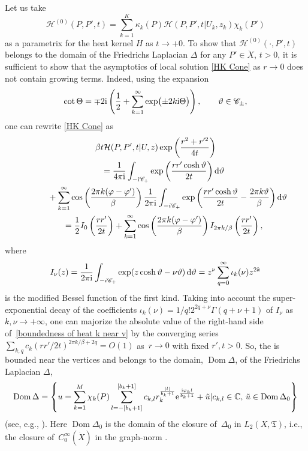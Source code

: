 \documentclass[pdftex]{sigma}
\numberwithin{equation}{section}
\theoremstyle{definition}
\begin{document}
Let us take
\begin{equation}
\label{parametrix}
\mathscr{H}^{(0)}(P,P',t)=\sum_{k=1}^K\kappa_k(P)\mathcal{H}(P,P',t|U_k,z_k)\chi_k(P')
\end{equation}
as a parametrix for the heat kernel $H$ as $t\to+0$. To show that $\mathscr{H}^{(0)}(\cdot,P',t)$ belongs to the domain of the Friedrichs Laplacian $\Delta$ for any $P'\in\dot{X}$, $t>0$, it is sufficient to show that the asymptotics of local solution \eqref{HK Cone} as $r\to 0$ does not contain growing terms. Indeed, using the expansion
\begin{align*}
\operatorname{cot}\Theta=\mp 2{\rm i}\left(\frac{1}{2}+\sum_{k=1}^\infty \exp\bigl(\pm 2k {\rm i}\Theta\bigr)\right), \qquad \vartheta\in\mathscr{C}_\pm,
\end{align*}
one can rewrite \eqref{HK Cone} as
\begin{gather}
\beta t \mathcal{H}(P,P',t|U,z) \exp\left(\frac{r^2+r'^{2}}{4t}\right)\nonumber\\
\qquad=\frac{1}{4\pi {\rm i} }\int_{-{\rm i}\mathscr{C}_+}\exp\left(\frac{rr'\cosh \vartheta}{2t}\right) {\rm d}\vartheta\nonumber
\\
\phantom{\qquad=}{}+\sum_{k=1}^\infty \cos \left(\frac{2\pi k(\varphi-\varphi')}{\beta}\right)\frac{1}{2\pi {\rm i} }\int_{-i\mathscr{C}_+}\exp\left(\frac{rr'\cosh \vartheta}{2t}-\frac{2\pi k\vartheta}{\beta}\right){\rm d}\vartheta\nonumber\\
\qquad=\frac{1}{2}I_0\left(\frac{rr'}{2t}\right)+\sum_{k=1}^\infty \cos \left(\frac{2\pi k(\varphi-\varphi')}{\beta}\right)I_{2\pi k/\beta}\left(\frac{rr'}{2t}\right),\label{boundedness of heat k near v}
\end{gather}
where
\[I_{\nu}(z)=\frac{1}{2\pi {\rm i} }\int_{-i\mathscr{C}_+}\exp(z\cosh \vartheta-\nu\vartheta)\, {\rm d}\vartheta= z^{\nu}\sum_{q=0}^{\infty}\iota_k(\nu)z^{2k}\]
is the modified Bessel function of the first kind. Taking into account the super-exponential decay of the coefficients $\iota_k(\nu)=1/q!2^{2q+\nu}\Gamma(q+\nu+1)$ of $I_{\nu}$ as $k,\nu\to +\infty$, one can majorize the absolute value of the right-hand side of~\eqref{boundedness of heat k near v} by the converging series $\sum_{k,q}c_k(rr'/2t)^{2\pi k/\beta+2q}=O(1)$
as~${r\to 0}$ with fixed $r', t>0$.
So, the  is bounded near the vertices and belongs to the domain, $\operatorname{Dom}\Delta$, of the Friedrichs Laplacian $\Delta$,
\[\operatorname{Dom}\Delta=\left\{u=\sum_{k=1}^M\chi_k(P)\sum_{l=-[b_k+1]}^{[b_k+1]}c_{k,l} r_k^{\frac{|l|}{b_k+1}}{\rm e}^{\frac{{\rm i}\varphi_k l}{b_k+1}}+\tilde{u} | c_{k,l}\in\mathbb{C},\, \tilde{u}\in\operatorname{Dom}\Delta_0\right\}\]
(see, e.g., \cite{Mooers}). Here $\operatorname{Dom}\Delta_0$ is the domain of the closure of~$\Delta_0$ in $L_2(X,\mathfrak{T})$, i.e., the closure of~$C_0^\infty(\dot{X})$ in the graph-norm .
\end{document}

